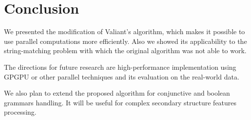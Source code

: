 \section{\bf Conclusion}

We presented the modification of Valiant's algorithm, which makes it possible to use parallel computations more efficiently. 
Also we showed its applicability to the string-matching problem with which the original algorithm was not able to work.

The directions for future research are high-performance implementation using GPGPU or other parallel techniques and its evaluation on the real-world data.

We also plan to extend the proposed algorithm for conjunctive and boolean grammars handling.
It will be useful for complex secondary structure features processing.